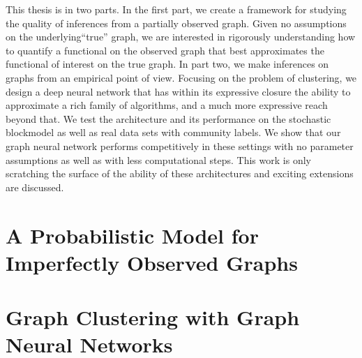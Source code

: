 \documentclass{ucbthesis}
\theoremstyle{definition}
\theoremstyle{remark}
\begin{document}
This thesis is in two parts.  In the first part, we create a framework for studying the quality of inferences from a partially observed graph.  Given no assumptions on the underlying``true'' graph, we are interested in rigorously understanding how to quantify a functional on the observed graph that best approximates the functional of interest on the true graph. In part two, we make inferences on graphs from an empirical point of view.  Focusing on the problem of clustering, we design a deep neural network that has within its expressive closure the ability to approximate a rich family of algorithms, and a much more expressive reach beyond that.  We test the architecture and its performance on the stochastic blockmodel as well as real data sets with community labels.  We show that our graph neural network performs competitively in these settings with no parameter assumptions as well as with less computational steps. This work is only scratching the surface of the ability of these architectures and exciting extensions are discussed.

\part{A Probabilistic Model for Imperfectly Observed Graphs}







\part{Graph Clustering with Graph Neural Networks}





%

\appendix
\printbibliography
\end{document}
